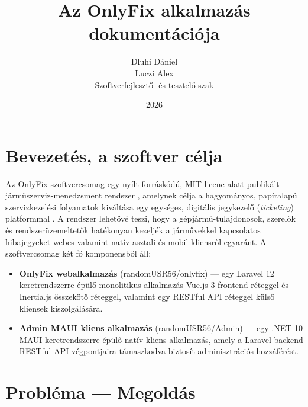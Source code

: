 \documentclass[colorlinks]{thesis-kando}
\begin{document}
\title{Az OnlyFix alkalmazás dokumentációja}
\author{Dluhi Dániel\\Luczi Alex\\Szoftverfejlesztő- és tesztelő szak}
\date{2026}

\maketitle

\tableofcontents
\newpage

\chapter{Bevezetés, a szoftver célja}

Az OnlyFix szoftvercsomag egy nyílt forráskódú, MIT licenc alatt publikált járműszerviz-menedzsment rendszer \cite{ref2}, amelynek célja a hagyományos, papíralapú szervizkezelési folyamatok kiváltása egy egységes, digitális jegykezelő (\emph{ticketing}) platformmal \cite{ref1}. A rendszer lehetővé teszi, hogy a gépjármű-tulajdonosok, szerelők és rendszerüzemeltetők hatékonyan kezeljék a járművekkel kapcsolatos hibajegyeket webes valamint natív asztali és mobil kliensről egyaránt. A szoftvercsomag két fő komponensből áll:

\begin{itemize}
\item \textbf{OnlyFix webalkalmazás} (randomUSR56/onlyfix) --- egy Laravel 12 keretrendszerre épülő monolitikus alkalmazás Vue.js 3 frontend réteggel és Inertia.js összekötő réteggel, valamint egy RESTful API réteggel külső kliensek kiszolgálására.
\item \textbf{Admin MAUI kliens alkalmazás} (randomUSR56/Admin) --- egy .NET 10 MAUI keretrendszerre épülő natív kliens alkalmazás, amely a Laravel backend RESTful API végpontjaira támaszkodva biztosít adminisztrációs hozzáférést.
\end{itemize}

\chapter{Probléma --- Megoldás}
\end{document}
